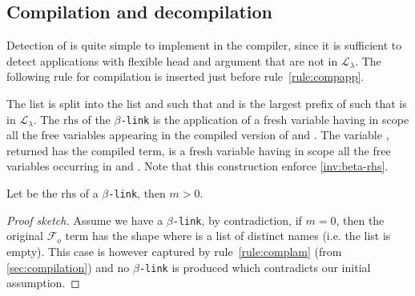 \documentclass[sigconf,natbib=false,review]{acmart}
\newcommand{\appsep}{\ensuremath{\textcolor{lightgray}{\cdot}}}
\newcommand{\llambda}{\ensuremath{\mathcal{L}_\lambda}\xspace}
\newcommand{\linkMacro}[1]{\ensuremath{#1}\texttt{-link}\xspace}
\newcommand{\linkbeta}{\linkMacro{\beta}}
\newcommand{\Fo}{\ensuremath{\mathcal{F}_{\!o}\xspace}} %
\newcommand{\linkbetaM}[3]{\ensuremath{#1 \vdash #2 =_\beta #3}}
\newcommand{\rhs}{\ensuremath{\mathrm{rhs}}\xspace}
\newcommand{\linkStore}{\ensuremath{\mathbb{L}}\xspace}
\begin{document}


\subsection{Compilation and decompilation}

Detection of \notllambda is quite simple to implement in the compiler, since it
is sufficient to detect applications with flexible head and argument that
are not in \llambda. The following rule for \notllambda compilation is inserted 
just before rule~\ref{rule:compapp}.




The list  is split into the list  and  such
that  and  is the largest prefix of
 such that  is in \llambda. The \rhs of the \linkbeta is
the application of a fresh variable  having in scope all the free
variables appearing in the compiled version of  and . The
variable , returned has the compiled term, is a fresh variable having in
scope all the free variables occurring in  and .
Note that this construction enforce \cref{inv:beta-rhs}.


\begin{corollary}
  Let \rhsBeta be the \rhs of a \linkbeta, then $m > 0$.
\end{corollary}

\begin{proof}[Proof sketch]
  Assume we have a \linkbeta, by contradiction, if $m = 0$, then the original
  \Fo{} term has the shape  where  is a
  list of distinct names (i.e. the list  is empty). This case is
  however captured by rule~\ref{rule:complam} (from \cref{sec:compilation}) and
  no \linkbeta is produced which contradicts our initial assumption.
\end{proof}
\end{document}
